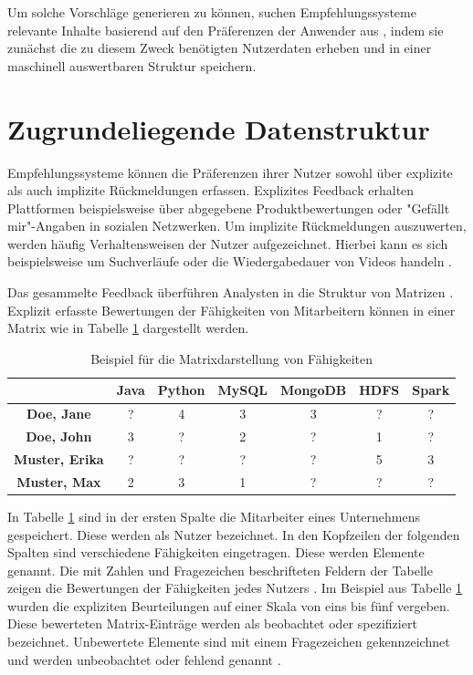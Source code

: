 Um solche Vorschläge generieren zu können, suchen Empfehlungssysteme relevante Inhalte basierend auf den Präferenzen der Anwender aus \cite[S. 1]{das:2017}, indem sie zunächst die zu diesem Zweck benötigten Nutzerdaten erheben und in einer maschinell auswertbaren Struktur speichern.

\section{Zugrundeliegende Datenstruktur}
\label{ch:empfehlungssysteme:arbeitsweise}
Empfehlungssysteme können die Präferenzen ihrer Nutzer sowohl über explizite als auch implizite Rückmeldungen erfassen. Explizites Feedback erhalten Plattformen beispielsweise über abgegebene Produktbewertungen oder "Gefällt mir"-Angaben in sozialen Netzwerken. Um implizite Rückmeldungen auszuwerten, werden häufig Verhaltensweisen der Nutzer aufgezeichnet. Hierbei kann es sich beispielsweise um Suchverläufe oder die Wiedergabedauer von Videos handeln \cite[S. 3]{pu:2012}.

Das gesammelte Feedback überführen Analysten in die Struktur von Matrizen \cite[S. 11f.]{recommenderSystems:2016}. Explizit erfasste Bewertungen der Fähigkeiten von Mitarbeitern können in einer Matrix wie in Tabelle \ref{tbl:empfehlungssysteme:arbeitsweise:tbl1} dargestellt werden.

\begin{table}[h]
	\centering
	\begin{tabular}{c|c|c|c|c|c|c}
	 & \textbf{Java} & \textbf{Python} & \textbf{MySQL} & \textbf{MongoDB} & \textbf{HDFS} & \textbf{Spark}\\ 
	\hline
	\textbf{Doe, Jane}     & ? & 4 & 3 & 3 & ? & ?\\
	\textbf{Doe, John}     & 3 & ? & 2 & ? & 1 & ?\\
	\textbf{Muster, Erika} & ? & ? & ? & ? & 5 & 3\\
	\textbf{Muster, Max}   & 2 & 3 & 1 & ? & ? & ?
	\end{tabular}
	\caption{Beispiel für die Matrixdarstellung von Fähigkeiten}
	\label{tbl:empfehlungssysteme:arbeitsweise:tbl1}
\end{table}

In Tabelle \ref{tbl:empfehlungssysteme:arbeitsweise:tbl1} sind in der ersten Spalte die Mitarbeiter eines Unternehmens gespeichert. Diese werden als Nutzer bezeichnet. In den Kopfzeilen der folgenden Spalten sind verschiedene Fähigkeiten eingetragen. Diese werden Elemente genannt. Die mit Zahlen und Fragezeichen beschrifteten Feldern der Tabelle zeigen die Bewertungen der Fähigkeiten jedes Nutzers \cite[S. 1f.]{strub:2016}. Im Beispiel aus Tabelle \ref{tbl:empfehlungssysteme:arbeitsweise:tbl1} wurden die expliziten Beurteilungen auf einer Skala von eins bis fünf vergeben. Diese bewerteten Matrix-Einträge werden  als beobachtet oder spezifiziert bezeichnet. Unbewertete Elemente sind mit einem Fragezeichen gekennzeichnet und werden unbeobachtet oder fehlend genannt \cite[S. 8]{recommenderSystems:2016}.

